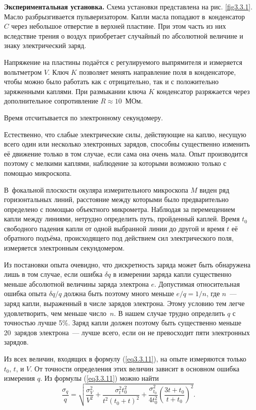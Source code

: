 {\bf Экспериментальная установка.} Схема установки представлена на рис. \ref{fig3.3.1}. Масло разбрызгивается пульверизатором. Капли масла попадают в~конденсатор~$C$ через небольшое отверстие в верхней пластине. При этом часть из них вследствие трения о воздух приобретает случайный по абсолютной величине и знаку электрический заряд.

Напряжение на пластины подаётся с регулируемого выпрямителя и измеряется вольтметром $V$. Ключ $K$ позволяет менять
направление поля в конденсаторе, чтобы можно было работать  как с отрицательно, так и с положительно заряженными
каплями. При размыкании ключа $K$ конденсатор разряжается через дополнительное сопротивление $R\approx 10$~МОм.

Время отсчитывается по электронному секундомеру.

Естественно, что слабые электрические силы, действующие на каплю, несущую всего
 один или несколько электронных зарядов, способны существенно изменить её движение только в том случае, если сама она очень мала. Опыт производится поэтому с мелкими каплями, наблюдение за которыми возможно только с помощью микроскопа.

В~фокальной плоскости окуляра измерительного микроскопа $M$ виден ряд горизонтальных линий, расстояние между которыми было предварительно определено с помощью объектного микрометра. Наблюдая за перемещением капли между линиями, нетрудно определить путь, пройденный каплей. Время $t_0$ свободного падения капли от одной выбранной линии до другой и время $t$ её обратного подъёма, происходящего под действием сил электрического поля, измеряется электронным секундомером.

Из постановки опыта очевидно, что дискретность заряда может быть обнаружена лишь в том случае, если ошибка $\delta q$ в измерении заряда капли существенно меньше абсолютной величины заряда электрона $e$. Допустимая относительная ошибка опыта $\delta q/q$ должна быть поэтому много меньше $e/q=1/n$, где $n$~--- заряд капли, выраженный в числе зарядов электрона. Этому условию тем легче удовлетворить, чем меньше число~$n$. В нашем случае трудно определить $q$ с точностью лучше 5\%. Заряд капли должен поэтому быть существенно меньше 20~зарядов электрона~--- лучше всего, если он не превосходит пяти электронных зарядов.

Из всех величин, входящих в формулу (\ref{eq3.3.11}), на опыте измеряются только $t_0$, $t$, и $V$. От точности определения этих величин зависит в основном ошибка измерения $q$. Из формулы (\ref{eq3.3.11}) можно найти
\begin{equation}
\frac{\sigma_q}{q}=\sqrt{\frac{\sigma^2_V}{V^2}+\frac{\sigma^2_t t_0^2}{t^2(t_0+t)^2}+
\frac{\sigma^2_{t_0}}{4t^2_0}\left(\frac{3t+t_0} {t+t_0}\right)^2}.
\label{eq3.3.12}
\end{equation}

